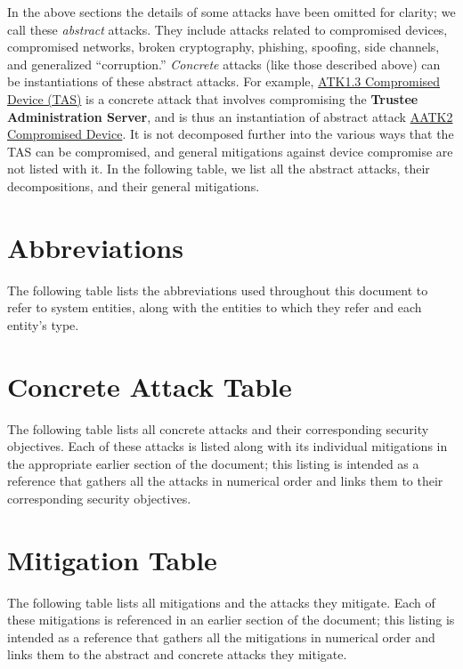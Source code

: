 \documentclass[10pt,letterpaper]{article}
\begin{document}
In the above sections the details of some attacks have been omitted for clarity; we call these \emph{abstract} attacks. They include attacks related to compromised devices, compromised networks, broken cryptography, phishing, spoofing, side channels, and generalized ``corruption.'' \emph{Concrete} attacks (like those described above) can be instantiations of these abstract attacks. For example, \hyperlink{ATK1.3}{ATK1.3 Compromised Device (TAS)} is a concrete attack that involves compromising the \textbf{Trustee Administration Server}, and is thus an instantiation of abstract attack \hyperlink{AATK2}{AATK2 Compromised Device}. It is not decomposed further into the various ways that the TAS can be compromised, and general mitigations against device compromise are not listed with it. In the following table, we list all the abstract attacks, their decompositions, and their general mitigations.



\appendix

\pagebreak
\section{Abbreviations}
\label{appendix:abbreviations}

The following table lists the abbreviations used throughout this document to refer to system entities, along with the entities to which they refer and each entity's type.



\pagebreak
\section{Concrete Attack Table}
\label{appendix:attacks}

The following table lists all concrete attacks and their corresponding security objectives. Each of these attacks is listed along with its individual mitigations in the appropriate earlier section of the document; this listing is intended as a reference that gathers all the attacks in numerical order and links them to their corresponding security objectives.



\pagebreak
\section{Mitigation Table}
\label{appendix:mitigations}

The following table lists all mitigations and the attacks they mitigate. Each of these mitigations is referenced in an earlier section of the document; this listing is intended as a reference that gathers all the mitigations in numerical order and links them to the abstract and concrete attacks they mitigate.



\pagebreak
\printbibliography[heading=bibintoc]
\end{document}
